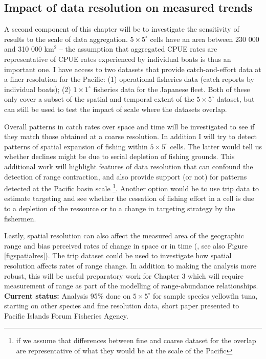\documentclass{article}
\newcommand{\griddef}[2]{$#1 \times #2^\circ$}
\begin{document}

\subsection{Impact of data resolution on measured trends}
\label{chap2part2}

A second component of this chapter will be to investigate the
sensitivity of results to the scale of data aggregation. \griddef{5}{5}
cells have an area between 230 000 and 310 000 km$^2$ -- the assumption
that aggregated CPUE rates are representative of
CPUE rates experienced by individual boats is thus an important one. I
have access to two datasets that provide catch-and-effort data at a finer
resolution for the Pacific: (1) operational fisheries data (catch reports by
individual boats); (2) \griddef{1}{1} fisheries data for the Japanese
fleet. Both of these only cover a subset of the spatial and temporal
extent of the \griddef{5}{5} dataset, but can still be used to test
the impact of scale where the datasets overlap.

Overall patterns in catch rates over space and time will be investigated to
see if they match those obtained at a coarse resolution. In addition I
will try to detect patterns of spatial expansion of fishing within
\griddef{5}{5} cells. The latter would tell us whether
declines might be due to serial depletion of fishing
grounds. This additional work will highlight features of data
resolution that can confound the detection of range contraction, and
also provide support (or not) for patterns detected at the Pacific
basin scale \footnote{if we assume that
differences between fine and coarse dataset for the overlap are
representative of what they would be at the scale of the
Pacific}. Another option would be to use trip data to estimate
targeting and see whether the cessation of fishing effort in a cell is
due to a depletion of the ressource or to a change in
targeting strategy by the fishermen.

Lastly, spatial resolution can also affect the measured area of the
geographic range \citep{Hurlbert2007_a} and bias perceived rates of
change in space or in time (\citealp{Rahbek2005_a}, see also Figure
\ref{figspatialres}). The trip dataset could
be used to investigate how spatial resolution affects rates of range
change. In addition to making the analysis more robust, this will be
useful preparatory work for Chapter 3 which will require measurement
of range as part of the modelling of range-abundance relationships.
\\
\textbf{Current status:} Analysis 95\% done on \griddef{5}{5} for sample
species yellowfin tuna, starting on other species and fine resolution
data, short paper presented to Pacific Islands Forum Fisheries Agency.
\end{document}
